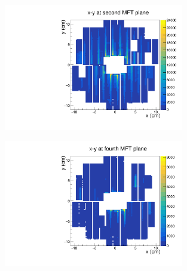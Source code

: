 \documentclass[10pt]{beamer}
\begin{document}
\begin{frame}
\begin{columns}[T]
\begin{column}{0.5\textwidth}
            \begin{figure}
                \begin{center}
                    \includegraphics[width=0.7\textwidth]{Plots/pass4_MFT/x_y_2_pass4.pdf}
                \end{center}
            \end{figure}
            \vspace*{-0.7cm}
            \begin{figure}
                \begin{center}
                    \includegraphics[width=0.7\textwidth]{Plots/pass4_MFT/x_y_4_pass4.pdf}
                \end{center}
            \end{figure}
        \end{column}
    \end{columns}

\end{frame}
\end{document}
